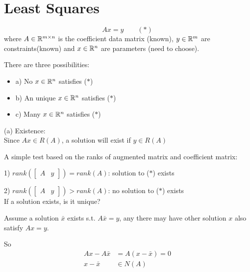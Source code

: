 



\section{Least Squares}
 
\begin{equation*}
Ax = y \qquad (*)
\end{equation*}
where $A\in \mathbb{R}^{m\times n}$ is the coefficient data matrix (known), $y\in \mathbb{R}^m$ are constraints(known) and $x\in \mathbb{R}^n$ are parameters (need to choose).

There are three possibilities:

\begin{itemize}
	\item a) No $x\in \mathbb{R}^n$ satisfies ($*$)
	
	\item b) An unique $x\in \mathbb{R}^n$ satisfies ($*$)
	
	\item c) Many $x\in \mathbb{R}^n$ satisfies ($*$)
\end{itemize}

(a) Existence:\\

Since $Ax\in R(A)$, a solution will exist if $y\in R(A)$

A simple test based on the ranks of augmented matrix and coefficient matrix:

1) $rank(\begin{bmatrix}
A&y
\end{bmatrix}) = rank(A)$: solution to ($*$) exists

2) $rank(\begin{bmatrix}
A&y
\end{bmatrix}) > rank(A)$: no solution to ($*$) exists\\

\vspace{0.4cm}
If a solution exists, is it unique?

Assume a solution $\bar{x}$ exists s.t. $A\bar{x} = y$, any there may have other solution $x$ also satisfy $Ax = y$. 

So 
\begin{align*}
Ax - A\bar{x} &= A(x -\bar{x}) = 0\\
x - \bar{x} &\in N(A)
\end{align*}


